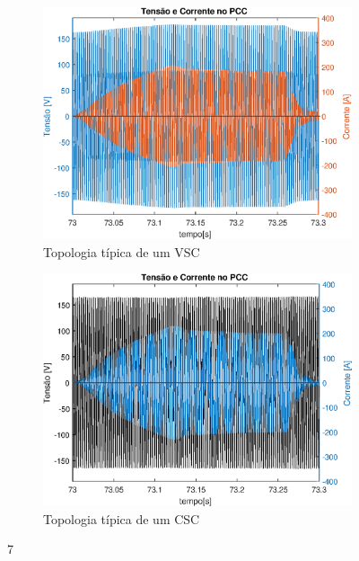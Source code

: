 \begin{figure}[!htb] %
	\centering
	\begin{subfigure}[b]{0.48\textwidth}
		\centering
		\includegraphics[width=\textwidth]{Cap4/Figuras/resultados_unfilt_7.eps}
		\caption{Topologia típica de um VSC} 
		\label{fig:resultados_unfilt_7.eps}
	\end{subfigure}%
		\hfill
	\begin{subfigure}[b]{0.48\textwidth}  
		\centering 
		\includegraphics[width=\textwidth]{Cap4/Figuras/resultados_filt_7.eps}
		\caption{Topologia típica de um CSC}    
		\label{fig:resultados_filt_7.eps}
	\end{subfigure}%
	\caption{7}
	\label{fig:7}
\end{figure}

